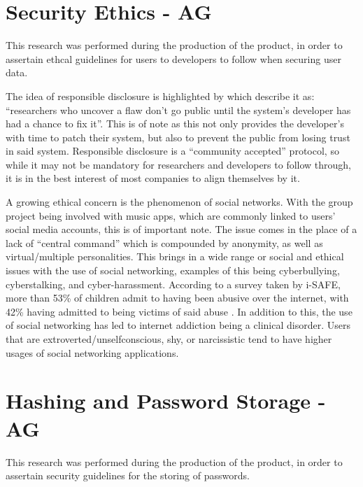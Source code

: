 \documentclass[10pt]{report}
\begin{document}
\section{Security Ethics - AG}
\label{res:secehtics}

This research was performed during the production of the product, in order to assertain ethcal guidelines for users to developers to follow when securing user data.\newline

The idea of responsible disclosure is highlighted by \cite{2010a} which describe it as: “researchers who uncover a flaw don't go public until the system's developer has had a chance to fix it”.  This is of note as this not only provides the developer’s with time to patch their system, but also to prevent the public from losing trust in said system.  Responsible disclosure is a “community accepted” protocol, so while it may not be mandatory for researchers and developers to follow through, it is in the best interest of most companies to align themselves by it.

A growing ethical concern is the phenomenon of social networks.  With the group project being involved with music apps, which are commonly linked to users’ social media accounts, this is of important note.  The issue comes in the place of a lack of “central command” which is compounded by anonymity, as well as virtual/multiple personalities.  This brings in a wide range or social and ethical issues with the use of social networking, examples of this being cyberbullying, cyberstalking, and cyber-harassment.  According to a survey taken by i-SAFE, more than 53\% of children admit to having been abusive over the internet, with 42\% having admitted to being victims of said abuse \cite{iSAFE2004}. In addition to this, the use of social networking has led to internet addiction being a clinical disorder.  Users that are extroverted/unselfconscious, shy, or narcissistic \cite{Kizza2016} tend to have higher usages of social networking applications.  


\section{Hashing and Password Storage - AG}
\label{res:passsec}

This research was performed during the production of the product, in order to assertain security guidelines for the storing of passwords.\newline
\end{document}
